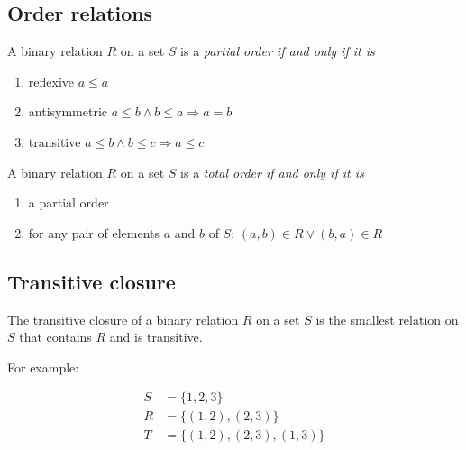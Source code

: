 \subsection*{Order relations}

A binary relation $R$ on a set $S$ is a \em{partial} order if and only if it is
\begin{enumerate}
\item reflexive $ a \leq a $
\item antisymmetric $ a \leq b \land b \leq a \Rightarrow a = b $
\item transitive $ a \leq b \land b \leq c \Rightarrow a \leq c $
\end{enumerate}

A binary relation $R$ on a set $S$ is a \em{total} order if and only if it is
\begin{enumerate}
\item a partial order
\item for any pair of elements $a$ and $b$ of $S$: $ (a, b) \in R \lor (b, a) \in R $
\end{enumerate}

\subsection*{Transitive closure}

The transitive closure of a binary relation $R$ on a set $S$ is the smallest relation on $S$ that contains $R$ and is transitive.

For example:

\begin{align*}
S &= \{1, 2, 3\} \\
R &= \{(1, 2), (2, 3)\} \\
T &= \{(1, 2), (2, 3), (1, 3)\}
\end{align*}
